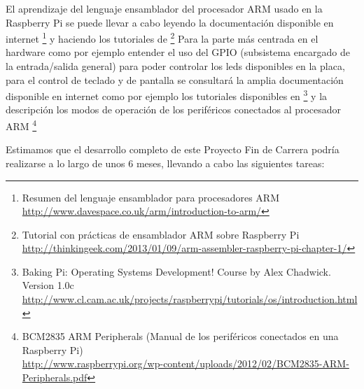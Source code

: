 El aprendizaje del lenguaje ensamblador del procesador ARM usado en la Raspberry Pi
se puede llevar a cabo leyendo la documentación disponible en internet
\footnote{Resumen del lenguaje ensamblador para procesadores ARM\\
\url{http://www.davespace.co.uk/arm/introduction-to-arm/}}
y haciendo los tutoriales de
\footnote{Tutorial con prácticas de ensamblador ARM sobre Raspberry Pi\\
\url{http://thinkingeek.com/2013/01/09/arm-assembler-raspberry-pi-chapter-1/}}
Para la parte más centrada en el hardware como por ejemplo entender el uso del GPIO
(subsistema encargado de la entrada/salida general) para poder controlar los leds
disponibles en la placa, para el control de teclado y de pantalla se consultará la
amplia documentación disponible en internet como por ejemplo los tutoriales disponibles en
\footnote{Baking Pi: Operating Systems Development! Course by Alex Chadwick. Version 1.0c\\
\url{http://www.cl.cam.ac.uk/projects/raspberrypi/tutorials/os/introduction.html}}
y la descripción los modos de operación de los periféricos conectados al procesador ARM
\footnote{BCM2835 ARM Peripherals (Manual de los periféricos conectados en una Raspberry Pi)\\
\url{http://www.raspberrypi.org/wp-content/uploads/2012/02/BCM2835-ARM-Peripherals.pdf}}

Estimamos que el desarrollo completo de este Proyecto Fin de Carrera podría realizarse
a lo largo de unos 6 meses, llevando a cabo las siguientes tareas:

